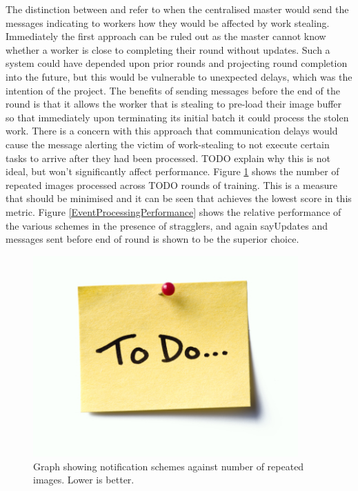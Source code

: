 \documentclass[12pt]{article}
\begin{document}
The distinction between  and  refer to when the centralised master would send the messages indicating to workers how they would be affected by work stealing. Immediately the first approach can be ruled out as the master cannot know whether a worker is close to completing their round without updates. Such a system could have depended upon prior rounds and projecting round completion into the future, but this would be vulnerable to unexpected delays, which was the intention of the project.
\newline
The benefits of sending messages before the end of the round is that it allows the worker that is stealing to pre-load their image buffer so that immediately upon terminating its initial batch it could process the stolen work. There is a concern with this approach that communication delays would cause the message alerting the victim of work-stealing to not execute certain tasks to arrive after they had been processed. TODO explain why this is not ideal, but won't significantly affect performance.
\newline
Figure \ref{RepeatedEvents} shows the number of repeated images processed across TODO rounds of training. This is a measure that should be minimised and it can be seen that  achieves the lowest score in this metric. Figure \ref{EventProcessingPerformance} shows the relative performance of the various schemes in the presence of stragglers, and again say{Updates and messages sent before end of round} is shown to be the superior choice.
\newline

\begin{figure}[H]
  \centering
  \includegraphics[width=4in]{todo}
  \caption[]{Graph showing notification schemes against number of repeated images. Lower is better.}
  \label{RepeatedEvents}
\end{figure}
\end{document}
